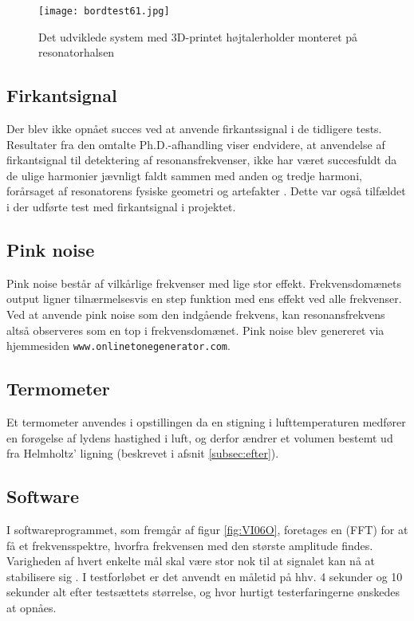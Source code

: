\begin{figure}[!h]
\centering
\texttt{[image: bordtest61.jpg]}
\caption{Det udviklede system med 3D-printet højtalerholder monteret på resonatorhalsen}
\label{fig:resmedholder}	
\end{figure}

\subsection{Firkantsignal}
Der blev ikke opnået succes ved at anvende firkantssignal i de tidligere tests. Resultater fra den omtalte Ph.D.-afhandling viser endvidere, at anvendelse af firkantsignal til detektering af resonansfrekvenser, ikke har været succesfuldt da de ulige harmonier jævnligt faldt sammen med anden og tredje harmoni, forårsaget af resonatorens fysiske geometri og artefakter \citep{RefWorks:22}. Dette var også tilfældet i der udførte test med firkantsignal i projektet. 

\subsection{Pink noise}
Pink noise består af vilkårlige frekvenser med lige stor effekt. Frekvensdomænets output ligner tilnærmelsesvis en step funktion med ens effekt ved alle frekvenser. Ved at anvende pink noise som den indgående frekvens, kan resonansfrekvens altså observeres som en top i frekvensdomænet. 
Pink noise blev genereret via hjemmesiden \texttt{www.onlinetonegenerator.com}. 

\subsection{Termometer}
Et termometer anvendes i opstillingen da en stigning i lufttemperaturen medfører en forøgelse af lydens hastighed i luft, og derfor ændrer et volumen bestemt ud fra Helmholtz' ligning (beskrevet i afsnit \ref{subsec:efter}). 

\subsection{Software}
 I softwareprogrammet, som fremgår af figur \ref{fig:VI06O}, foretages en (FFT) for at få et frekvensspektre, hvorfra frekvensen med den største amplitude findes. 
 Varigheden af hvert enkelte mål skal være stor nok til at signalet kan nå at stabilisere sig \citep{RefWorks:22}. I testforløbet er det anvendt en måletid på hhv. 4 sekunder og 10 sekunder alt efter testsættets størrelse, og hvor hurtigt testerfaringerne ønskedes at opnåes. 
 
